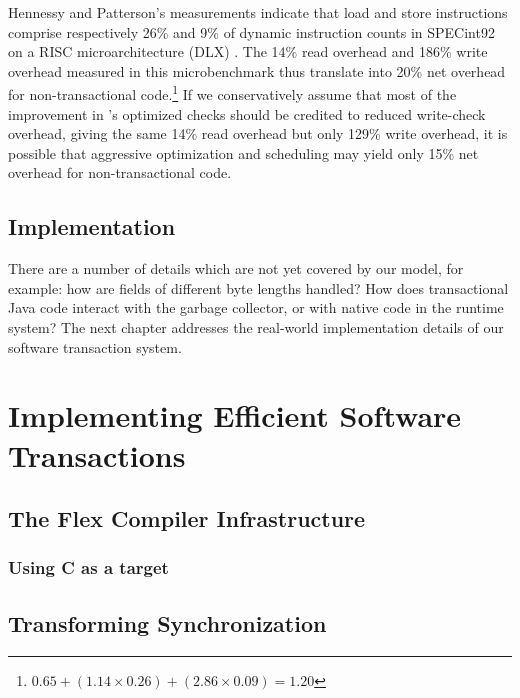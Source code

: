
Hennessy and Patterson's measurements indicate that load and store
instructions comprise respectively 26\% and 9\% of dynamic instruction
counts in SPECint92 on a RISC microarchitecture (DLX)
\cite[pp. 105]{HennessyPa96}.
The 14\% read overhead and 186\% write overhead measured
in this microbenchmark thus translate into 20\% net overhead for
non-transactional code.\footnote{$0.65 + (1.14 \times 0.26) + (2.86
  \times 0.09) = 1.20$}
 If we conservatively assume that most of the
improvement in 's optimized checks should be credited
to reduced write-check overhead, giving the same 14\% read overhead
but only 129\% write overhead, it is possible that aggressive
optimization and scheduling may yield only 15\% net overhead for
non-transactional code.

\section*{Implementation}
There are a number of details which are not yet covered by our model,
for example: how are fields of different byte lengths handled?  How does
transactional Java code interact with the garbage collector, or with
native code in the runtime system?  The next chapter addresses the
real-world
implementation details of our software transaction system.

\chapter{Implementing Efficient Software Transactions}\label{sec:stmimpl}

\section{The Flex Compiler Infrastructure}
\subsection{Using C as a target}

\section{Transforming Synchronization}
